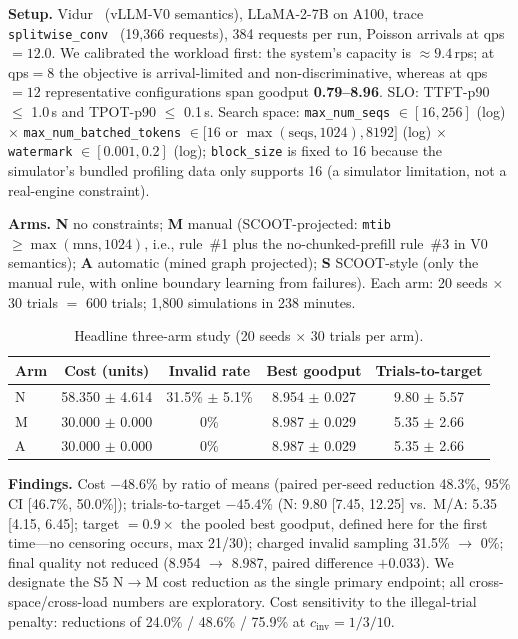 \documentclass[journal]{IEEEtran}
\newcommand{\code}[1]{\texttt{#1}}
\begin{document}
\textbf{Setup.} Vidur~\cite{ref6} (vLLM-V0 semantics), LLaMA-2-7B on A100, trace \code{splitwise\_conv}~\cite{splitwise} (19{,}366 requests), 384 requests per run, Poisson arrivals at qps${}=12.0$. We calibrated the workload first: the system's capacity is ${\approx}9.4$\,rps; at qps${}=8$ the objective is arrival-limited and non-discriminative, whereas at qps${}=12$ representative configurations span goodput \textbf{0.79--8.96}. SLO: TTFT-p90 $\leq$ 1.0\,s and TPOT-p90 $\leq$ 0.1\,s. Search space: \code{max\_num\_seqs} $\in [16,256]$ (log) $\times$ \code{max\_num\_batched\_tokens} $\in [16$ or $\max(\text{seqs},1024), 8192]$ (log) $\times$ \code{watermark} $\in [0.001,0.2]$ (log); \code{block\_size} is fixed to 16 because the simulator's bundled profiling data only supports 16 (a simulator limitation, not a real-engine constraint).

\textbf{Arms.} \textbf{N} no constraints; \textbf{M} manual (SCOOT-projected: \code{mtib} $\geq \max(\text{mns}, 1024)$, i.e., rule~\#1 plus the no-chunked-prefill rule~\#3 in V0 semantics); \textbf{A} automatic (mined graph projected); \textbf{S} SCOOT-style (only the manual rule, with online boundary learning from failures). Each arm: 20 seeds $\times$ 30 trials $=$ 600 trials; 1{,}800 simulations in 238 minutes.

\begin{table}[t]
\centering
\caption{Headline three-arm study (20 seeds $\times$ 30 trials per arm).}
\label{tab:headline}
\footnotesize
\setlength{\tabcolsep}{4pt}
\begin{tabular}{@{}lcccc@{}}
\toprule
Arm & Cost (units) & Invalid rate & Best goodput & Trials-to-target \\
\midrule
N & 58.350 $\pm$ 4.614 & 31.5\% $\pm$ 5.1\% & 8.954 $\pm$ 0.027 & 9.80 $\pm$ 5.57 \\
M & 30.000 $\pm$ 0.000 & 0\% & 8.987 $\pm$ 0.029 & 5.35 $\pm$ 2.66 \\
A & 30.000 $\pm$ 0.000 & 0\% & 8.987 $\pm$ 0.029 & 5.35 $\pm$ 2.66 \\
\bottomrule
\end{tabular}
\end{table}

\textbf{Findings.} Cost \textbf{$-48.6\%$} by ratio of means (paired per-seed reduction 48.3\%, 95\% CI [46.7\%, 50.0\%]); trials-to-target $-45.4\%$ (N: 9.80 [7.45, 12.25] vs.\ M/A: 5.35 [4.15, 6.45]; target $=0.9\times$ the pooled best goodput, defined here for the first time---no censoring occurs, max 21/30); charged invalid sampling 31.5\% $\rightarrow$ 0\%; final quality not reduced (8.954 $\rightarrow$ 8.987, paired difference $+0.033$). We designate the S5 N$\rightarrow$M cost reduction as the single primary endpoint; all cross-space/cross-load numbers are exploratory. Cost sensitivity to the illegal-trial penalty: reductions of 24.0\% / 48.6\% / 75.9\% at $c_{\text{inv}} = 1/3/10$.
\end{document}
